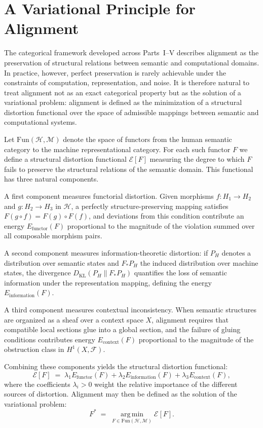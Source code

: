\documentclass[12pt]{article}
\theoremstyle{definition}
\begin{document}
\section{A Variational Principle for Alignment}

The categorical framework developed across Parts~I--V describes alignment as the
preservation of structural relations between semantic and computational domains.
In practice, however, perfect preservation is rarely achievable under the
constraints of computation, representation, and noise. It is therefore natural
to treat alignment not as an exact categorical property but as the solution of a
variational problem: alignment is defined as the minimization of a structural
distortion functional over the space of admissible mappings between semantic and
computational systems.

Let $\mathrm{Fun}(\mathcal{H}, \mathcal{M})$ denote the space of functors from
the human semantic category to the machine representational category. For each
such functor $F$ we define a structural distortion functional $\mathcal{E}[F]$
measuring the degree to which $F$ fails to preserve the structural relations of
the semantic domain. This functional has three natural components.

A first component measures functorial distortion. Given morphisms $f : H_1 \to
H_2$ and $g : H_2 \to H_3$ in $\mathcal{H}$, a perfectly structure-preserving
mapping satisfies $F(g \circ f) = F(g) \circ F(f)$, and deviations from this
condition contribute an energy $E_{\mathrm{functor}}(F)$ proportional to the
magnitude of the violation summed over all composable morphism pairs.

A second component measures information-theoretic distortion: if $P_H$ denotes
a distribution over semantic states and $F_* P_H$ the induced distribution over
machine states, the divergence $D_{\mathrm{KL}}(P_H \| F_* P_H)$ quantifies
the loss of semantic information under the representation mapping, defining the
energy $E_{\mathrm{information}}(F)$.

A third component measures contextual inconsistency. When semantic structures
are organized as a sheaf over a context space $X$, alignment requires that
compatible local sections glue into a global section, and the failure of gluing
conditions contributes energy $E_{\mathrm{context}}(F)$ proportional to the
magnitude of the obstruction class in $H^1(X, \mathcal{F})$.

Combining these components yields the structural distortion functional:
\begin{equation}
  \mathcal{E}[F]
  \;=\;
  \lambda_1 E_{\mathrm{functor}}(F)
  + \lambda_2 E_{\mathrm{information}}(F)
  + \lambda_3 E_{\mathrm{context}}(F),
\end{equation}
where the coefficients $\lambda_i > 0$ weight the relative importance of the
different sources of distortion. Alignment may then be defined as the solution
of the variational problem:
\begin{equation}
  F^{*} \;=\; \operatorname*{arg\,min}_{F \in \mathrm{Fun}(\mathcal{H},\mathcal{M})}
  \mathcal{E}[F].
\end{equation}
\end{document}
